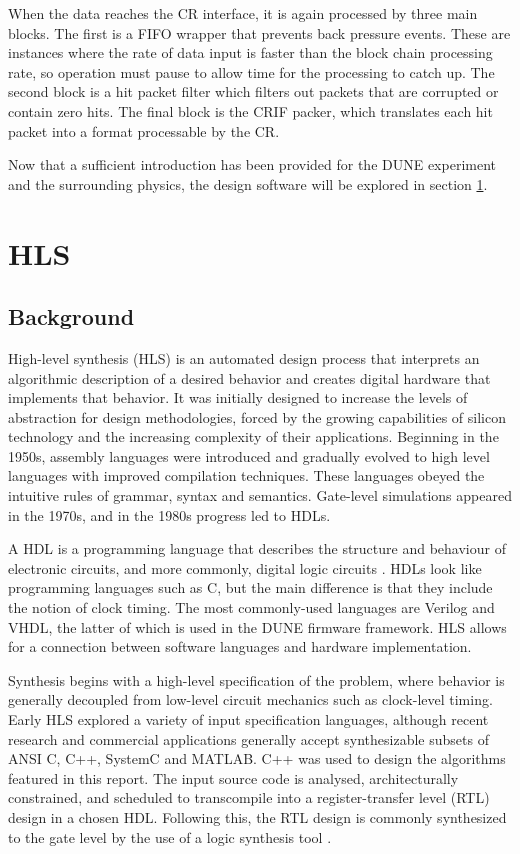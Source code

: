 \documentclass[10pt]{article}
\begin{document}
When the data reaches the CR interface, it is again processed by three main blocks. The first is a FIFO wrapper that prevents back pressure events. These are instances where the rate of data input is faster than the block chain processing rate, so operation must pause to allow time for the processing to catch up. The second block is a hit packet filter which filters out packets that are corrupted or contain zero hits. The final block is the CRIF packer, which translates each hit packet into a format processable by the CR.

Now that a sufficient introduction has been provided for the DUNE experiment and the surrounding physics, the design software will be explored in section \ref{HLS_section}.

\section{HLS}\label{HLS_section}

\subsection{Background}
High-level synthesis (HLS) is an automated design process that interprets an algorithmic description of a desired behavior and creates digital hardware that implements that behavior. It was initially designed to increase the levels of abstraction for design methodologies, forced by the growing capabilities of silicon technology and the increasing complexity of their applications. Beginning in the 1950s, assembly languages were introduced and gradually evolved to high level languages with improved compilation techniques. These languages obeyed the intuitive rules of grammar, syntax and semantics. Gate-level simulations appeared in the 1970s, and in the 1980s progress led to HDLs.

A HDL is a programming language that describes the structure and behaviour of electronic circuits, and more commonly, digital logic circuits \cite{coussy2009introduction}. HDLs look like programming languages such as C, but the main difference is that they include the notion of clock timing. The most commonly-used languages are Verilog and VHDL, the latter of which is used in the DUNE firmware framework. HLS allows for a connection between software languages and hardware implementation. 

Synthesis begins with a high-level specification of the problem, where behavior is generally decoupled from low-level circuit mechanics such as clock-level timing. Early HLS explored a variety of input specification languages, although recent research and commercial applications generally accept synthesizable subsets of ANSI C, C++, SystemC and MATLAB. C++ was used to design the algorithms featured in this report. The input source code is analysed, architecturally constrained, and scheduled to transcompile into a register-transfer level (RTL) design in a chosen HDL. Following this, the RTL design is commonly synthesized to the gate level by the use of a logic synthesis tool \cite{vivado_design_suite_user_guide_2018}.
\end{document}
